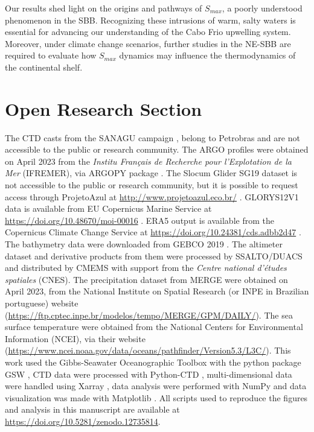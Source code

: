 \documentclass[draft]{agujournal2019}
\begin{document}
Our results shed light on the origins and pathways of \textit{$S_{max}$}, a poorly understood phenomenon in the SBB. Recognizing these intrusions of warm, salty waters is essential for advancing our understanding of the Cabo Frio upwelling system. Moreover, under climate change scenarios, further studies in the NE-SBB are required to evaluate how \textit{$S_{max}$} dynamics may influence the thermodynamics of the continental shelf.

%
%

\section*{Open Research Section}

The CTD casts from the SANAGU campaign \cite{moreira2023multidisciplinary}, belong to Petrobras and are not accessible to the public or research community. The ARGO profiles were obtained on April 2023 from the \textit{Institu Français de Recherche pour l'Explotation de la Mer} (IFREMER), via ARGOPY package \cite{Maze2020}. The Slocum Glider SG19 dataset is not accessible to the public or research community, but it is possible to request access through ProjetoAzul at \url{http://www.projetoazul.eco.br/} \cite{projetoazul2015}. GLORYS12V1 data is available from EU Copernicus Marine Service at \url{https://doi.org/10.48670/moi-00016} \cite{jean2021glorys}. ERA5 output is available from the Copernicus Climate Change Service at \url{https://doi.org/10.24381/cds.adbb2d47} \cite{hersbach2018era5}. The bathymetry data were downloaded from GEBCO 2019 \cite{weatherall2015new}. The altimeter dataset and derivative products from them were processed by SSALTO/DUACS and distributed by CMEMS \cite{aviso_cmems,aviso_cmems_ssh_at} with support from the \textit{Centre national d'études spatiales} (CNES).  The precipitation dataset from MERGE were obtained on April 2023, from the National Institute on Spatial Research (or INPE in Brazilian portuguese) website (\url{https://ftp.cptec.inpe.br/modelos/tempo/MERGE/GPM/DAILY/}). The sea surface temperature were obtained from the National Centers for Environmental Information (NCEI), via their website (\url{https://www.ncei.noaa.gov/data/oceans/pathfinder/Version5.3/L3C/}). This work used the Gibbs-Seawater Oceanographic Toolbox with the python package GSW \cite{mcdougall2011gsw}, CTD data were processed with Python-CTD \cite{Fernandes2014}, multi-dimensional data were handled using Xarray \cite{xarray2017}, data analysis were performed with NumPy \cite{numpy2020} and data visualization was made with Matplotlib \cite{Hunter2007Matplotlib}. All scripts used to reproduce the figures and analysis in this manuscript are available at \url{https://doi.org/10.5281/zenodo.12735814}.
\end{document}

